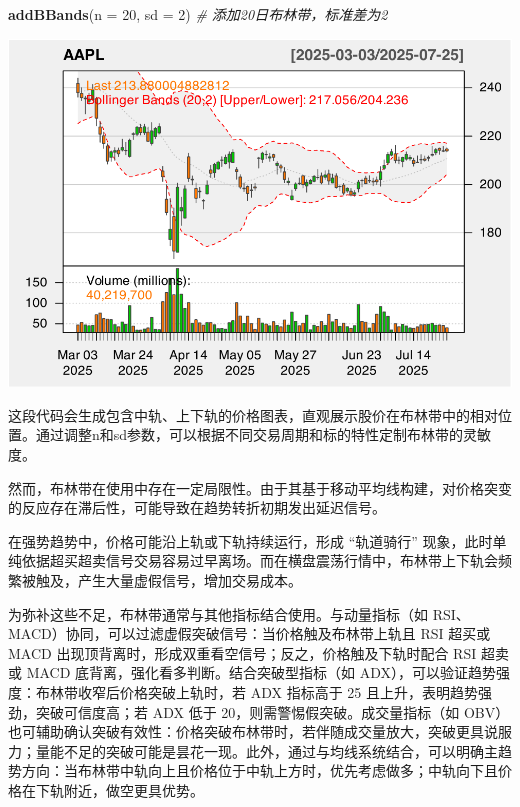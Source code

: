 \documentclass[]{ctexbook}
\newenvironment{Shaded}{\begin{snugshade}}{\end{snugshade}}
\newcommand{\AttributeTok}[1]{\textcolor[rgb]{0.13,0.29,0.53}{#1}}
\newcommand{\CommentTok}[1]{\textcolor[rgb]{0.56,0.35,0.01}{\textit{#1}}}
\newcommand{\DecValTok}[1]{\textcolor[rgb]{0.00,0.00,0.81}{#1}}
\newcommand{\FunctionTok}[1]{\textcolor[rgb]{0.13,0.29,0.53}{\textbf{#1}}}
\newcommand{\NormalTok}[1]{#1}
\begin{document}
\begin{Shaded}
\begin{Highlighting}[]
\FunctionTok{addBBands}\NormalTok{(}\AttributeTok{n =} \DecValTok{20}\NormalTok{, }\AttributeTok{sd =} \DecValTok{2}\NormalTok{)  }\CommentTok{\# 添加20日布林带，标准差为2  }
\end{Highlighting}
\end{Shaded}

\includegraphics[width=0.9\linewidth]{QuantmodHandbook_files/figure-latex/bb-2}

这段代码会生成包含中轨、上下轨的价格图表，直观展示股价在布林带中的相对位置。通过调整n和sd参数，可以根据不同交易周期和标的特性定制布林带的灵敏度。

然而，布林带在使用中存在一定局限性。由于其基于移动平均线构建，对价格突变的反应存在滞后性，可能导致在趋势转折初期发出延迟信号。

在强势趋势中，价格可能沿上轨或下轨持续运行，形成 ``轨道骑行'' 现象，此时单纯依据超买超卖信号交易容易过早离场。而在横盘震荡行情中，布林带上下轨会频繁被触及，产生大量虚假信号，增加交易成本。

为弥补这些不足，布林带通常与其他指标结合使用。与动量指标（如 RSI、MACD）协同，可以过滤虚假突破信号：当价格触及布林带上轨且 RSI 超买或 MACD 出现顶背离时，形成双重看空信号；反之，价格触及下轨时配合 RSI 超卖或 MACD 底背离，强化看多判断。结合突破型指标（如 ADX），可以验证趋势强度：布林带收窄后价格突破上轨时，若 ADX 指标高于 25 且上升，表明趋势强劲，突破可信度高；若 ADX 低于 20，则需警惕假突破。成交量指标（如 OBV）也可辅助确认突破有效性：价格突破布林带时，若伴随成交量放大，突破更具说服力；量能不足的突破可能是昙花一现。此外，通过与均线系统结合，可以明确主趋势方向：当布林带中轨向上且价格位于中轨上方时，优先考虑做多；中轨向下且价格在下轨附近，做空更具优势。
\end{document}
